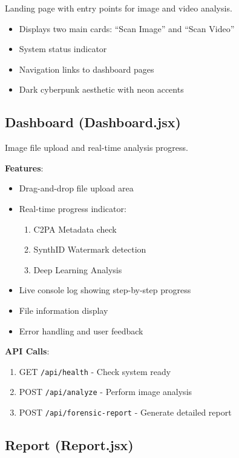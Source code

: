\documentclass[12pt,a4paper]{book}
\begin{document}
\begin{itemize}
Landing page with entry points for image and video analysis.

\begin{itemize}
    \item Displays two main cards: ``Scan Image'' and ``Scan Video''
    \item System status indicator
    \item Navigation links to dashboard pages
    \item Dark cyberpunk aesthetic with neon accents
\end{itemize}

\subsection{Dashboard (Dashboard.jsx)}

Image file upload and real-time analysis progress.

\textbf{Features}:
\begin{itemize}
    \item Drag-and-drop file upload area
    \item Real-time progress indicator:
    \begin{enumerate}
        \item C2PA Metadata check
        \item SynthID Watermark detection
        \item Deep Learning Analysis
    \end{enumerate}
    \item Live console log showing step-by-step progress
    \item File information display
    \item Error handling and user feedback
\end{itemize}

\textbf{API Calls}:
\begin{enumerate}
    \item GET \texttt{/api/health} - Check system ready
    \item POST \texttt{/api/analyze} - Perform image analysis
    \item POST \texttt{/api/forensic-report} - Generate detailed report
\end{enumerate}

\subsection{Report (Report.jsx)}


\end{itemize}
\end{document}
